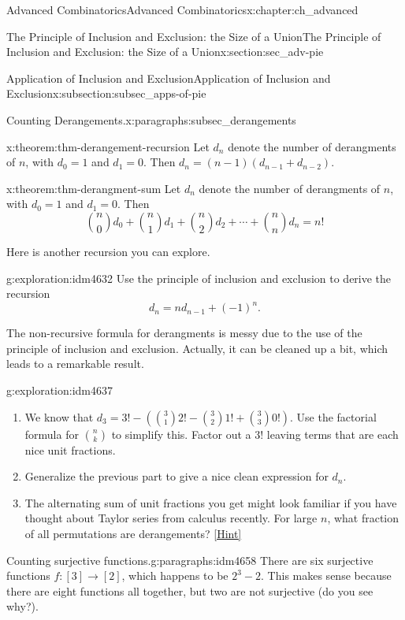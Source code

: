 \documentclass[oneside,10pt,]{book}
\numberwithin{equation}{chapter}
\begin{document}
\begin{chapterptx}{Advanced Combinatorics}{}{Advanced Combinatorics}{}{}{x:chapter:ch_advanced}
\begin{sectionptx}{The Principle of Inclusion and Exclusion: the Size of a Union}{}{The Principle of Inclusion and Exclusion: the Size of a Union}{}{}{x:section:sec_adv-pie}
\begin{subsectionptx}{Application of Inclusion and Exclusion}{}{Application of Inclusion and Exclusion}{}{}{x:subsection:subsec_apps-of-pie}
\begin{paragraphs}{Counting Derangements.}{x:paragraphs:subsec_derangements}
\begin{theorem}{}{}{x:theorem:thm-derangement-recursion}%
Let \(d_n\) denote the number of derangments of \(n\), with \(d_0 = 1\) and \(d_1 = 0\).  Then \(d_n = (n-1)(d_{n-1}+d_{n-2})\).%
\end{theorem}
\begin{theorem}{}{}{x:theorem:thm-derangment-sum}%
Let \(d_n\) denote the number of derangments of \(n\), with \(d_0 = 1\) and \(d_1 = 0\).  Then%
\begin{equation*}
\binom{n}{0}d_0 + \binom{n}{1}d_1 + \binom{n}{2}d_2 + \cdots + \binom{n}{n}d_n = n!
\end{equation*}
%
\end{theorem}
Here is another recursion you can explore.%
\begin{exploration}{}{g:exploration:idm4632}%
Use the principle of inclusion and exclusion to derive the recursion%
\begin{equation*}
d_n = nd_{n-1} + (-1)^n\text{.}
\end{equation*}
%
\end{exploration}
The non-recursive formula for derangments is messy due to the use of the principle of inclusion and exclusion.  Actually, it can be cleaned up a bit, which leads to a remarkable result.%
\begin{exploration}{}{g:exploration:idm4637}%
\begin{enumerate}[font=\bfseries,label=(\alph*),ref=\alph*]
\item{}We know that \(d_3 = 3! - \left(\binom{3}{1}2! - \binom{3}{2}1! + \binom{3}{3}0! \right)\).  Use the factorial formula for \(\binom{n}{k}\) to simplify this.  Factor out a \(3!\) leaving terms that are each nice unit fractions.%
\item{}Generalize the previous part to give a nice clean expression for \(d_n\).%
\item{}The alternating sum of unit fractions you get might look familiar if you have thought about Taylor series from calculus recently.  For large \(n\), what fraction of all permutations are derangements?%
\space\hspace*{0pt}\hfill{\tiny\hyperlink{g:hint:idm4652-back}{[Hint]}}\end{enumerate}
\end{exploration}
\end{paragraphs}%
\begin{paragraphs}{Counting surjective functions.}{g:paragraphs:idm4658}%
There are six surjective functions  \(f:[3]\to [2]\), which happens to be \(2^3 - 2\).  This makes sense because there are eight functions all together, but two are not surjective (do you see why?).%

\end{paragraphs}
\end{subsectionptx}
\end{sectionptx}
\end{chapterptx}
\end{document}
